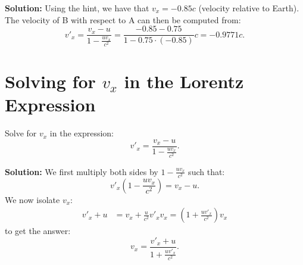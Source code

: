 \documentclass[a4paper,12pt]{article}
\begin{document}
\begin{multicols}{2}
\textbf{Solution:} Using the hint, we have that $v_x = -0.85c$ (velocity relative to Earth). The velocity of B with respect to A can then be computed from:
\begin{equation}
  v'_x = \frac{v_x - u}{1 - \frac{u v_x}{c^2}} = \frac{-0.85 - 0.75}{1 - 0.75 \cdot (-0.85)} c = -0.9771c.
\end{equation}

\section*{Solving for $v_x$ in the Lorentz Expression}
Solve for $v_x$ in the expression:
\begin{equation}
  v'_x = \frac{v_x - u}{1 - \frac{u v_x}{c^2}}.
\end{equation}

\textbf{Solution:} We first multiply both sides by $1 - \frac{u v_x}{c^2}$ such that:
\begin{equation}
  v'_x \left( 1 - \frac{u v_x}{c^2} \right) = v_x - u.
\end{equation}
We now isolate $v_x$:
\begin{align*}
  v'_x + u &= v_x + \frac{u}{c^2} v'_x v_x = \left( 1 + \frac{u v'_x}{c^2} \right) v_x
\end{align*}
to get the answer:
\begin{equation}
  v_x = \frac{v'_x + u}{1 + \frac{u v'_x}{c^2}}.
\end{equation}

\end{multicols}
\end{document}
